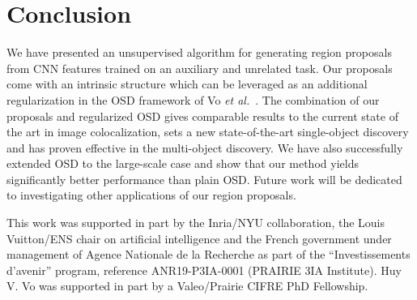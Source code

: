 \documentclass[runningheads]{llncs}
\begin{document}
\section{Conclusion}
We have presented an unsupervised algorithm for generating region proposals from CNN features trained on an auxiliary and unrelated task. Our proposals come with an intrinsic structure which can be leveraged as an additional regularization in the OSD framework of Vo {\em et al.}~\cite{Vo2019UnsupOptim}. The combination of our proposals and regularized OSD gives comparable results to the current state of the art in image colocalization, sets a new state-of-the-art single-object discovery and has proven effective in the multi-object discovery. We have also successfully extended OSD to the large-scale case and show that our method yields significantly better performance than plain OSD. Future work will be dedicated to investigating other applications of our region proposals. 

 This work was supported in part by the Inria/NYU collaboration, the Louis Vuitton/ENS chair on artificial intelligence and the French government under management of Agence Nationale de la Recherche as part of the “Investissements d’avenir” program, reference ANR19-P3IA-0001 (PRAIRIE 3IA Institute). Huy V. Vo was supported in part by a Valeo/Prairie CIFRE PhD Fellowship.
\end{document}
